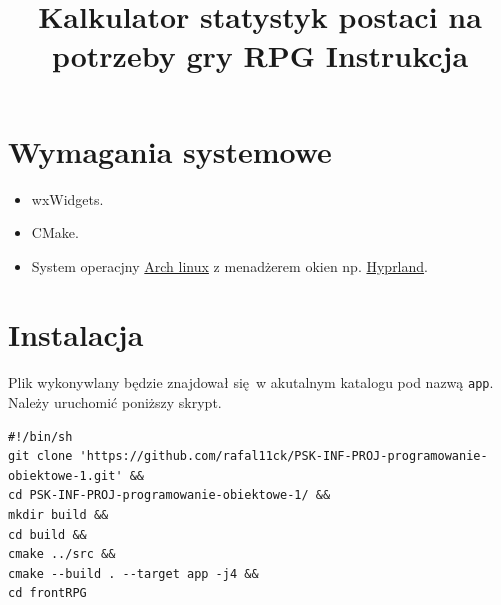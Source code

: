 \documentclass[11pt]{article}
\date{}
\title{Kalkulator statystyk postaci na potrzeby gry RPG Instrukcja}
\begin{document}
\maketitle
\newpage
\section{Wymagania systemowe}
\label{sec:org36e8277}
\begin{itemize}
\item wxWidgets.
\item CMake.
\item System operacjny \href{https://wiki.archlinux.org/title/Arch\_Linux}{Arch linux} z menadżerem okien np. \href{https://hyprland.org/}{Hyprland}.
\end{itemize}
\section{Instalacja}
\label{sec:org5283da3}
Plik wykonywlany będzie znajdował się w akutalnym katalogu pod nazwą \texttt{app}. Należy uruchomić poniższy skrypt.
\begin{verbatim}
#!/bin/sh
git clone 'https://github.com/rafal11ck/PSK-INF-PROJ-programowanie-obiektowe-1.git' &&
cd PSK-INF-PROJ-programowanie-obiektowe-1/ &&
mkdir build &&
cd build &&
cmake ../src &&
cmake --build . --target app -j4 &&
cd frontRPG
\end{verbatim}
\newpage
\end{document}
